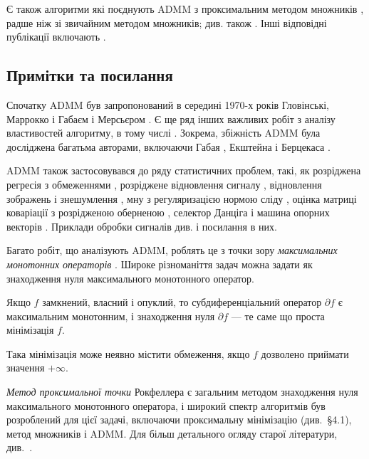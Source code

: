 Є також алгоритми які поєднують ADMM з проксимальним методом множників \cite{141}, радше ніж зі звичайним методом множників; див. також \cite{33, 60}. Інші відповідні публікації включають \cite{62, 143, 59, 147, 158, 159, 42}.

\subsection{Примітки та посилання}

Спочатку ADMM був запропонований в середині 1970-х років Гловінські, Маррокко \cite{86} і Габаєм і Мерсьєром \cite{82}. Є ще ряд інших важливих робіт з аналізу властивостей алгоритму, в тому числі \cite{76, 81, 75, 87, 157, 80, 65, 33}. Зокрема, збіжність ADMM була досліджена багатьма авторами, включаючи Габая \cite{81}, Екштейна і Берцекаса \cite{63}. \medskip

ADMM також застосовувався до ряду статистичних проблем, такі, як розріджена регресія з обмеженнями \cite{18}, розріджене відновлення сигналу \cite{70}, відновлення зображень і знешумлення \cite{72, 154, 134}, мну з регуляризацією нормою сліду \cite{174}, оцінка матриці коваріації з розрідженою оберненою \cite{178}, селектор Данціга \cite{116} і машина опорних векторів \cite{74}. Приклади обробки сигналів див. \cite{42, 40, 41, 150, 149} і посилання в них. \medskip

Багато робіт, що аналізують ADMM, роблять це з точки зору \textit{максимальних монотонних операторів} \cite{23, 141, 142, 63, 144}. Широке різноманіття задач можна задати як знаходження нуля максимального монотонного оператор.

\begin{example}
    Якщо $f$ замкнений, власний і опуклий, то субдиференціальний оператор $\partial f $ є максимальним монотонним, і знаходження нуля $ \partial f $ --- те саме що проста мінімізація $ f $.
\end{example}

\begin{remark}
    Така мінімізація може неявно містити обмеження, якщо $ f $ дозволено приймати значення $ + \infty$.
\end{remark}

\textit{Метод проксимальної точки} Рокфеллера \cite{142} є загальним методом знаходження нуля максимального монотонного оператора, і широкий спектр алгоритмів був розроблений для цієї задачі, включаючи проксимальну мінімізацію (див.~\S4.1), метод множників і ADMM. Для більш детального огляду старої літератури, див.~\cite[\S2]{57}. \medskip

